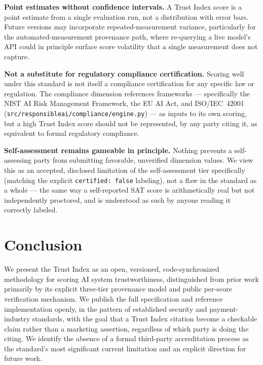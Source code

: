 \documentclass[11pt]{article}
\begin{document}
\textbf{Point estimates without confidence intervals.} A Trust Index
score is a point estimate from a single evaluation run, not a
distribution with error bars. Future versions may incorporate
repeated-measurement variance, particularly for the
automated-measurement provenance path, where re-querying a live
model's API could in principle surface score volatility that a single
measurement does not capture.

\textbf{Not a substitute for regulatory compliance certification.}
Scoring well under this standard is not itself a compliance
certification for any specific law or regulation. The compliance
dimension references frameworks --- specifically the NIST AI Risk
Management Framework, the EU AI Act, and ISO/IEC~42001
(\texttt{src/responsibleai/compliance/engine.py}) --- as inputs to its
own scoring, but a high Trust Index score should not be represented,
by any party citing it, as equivalent to formal regulatory compliance.

\textbf{Self-assessment remains gameable in principle.} Nothing
prevents a self-assessing party from submitting favorable, unverified
dimension values. We view this as an accepted, disclosed limitation of
the self-assessment tier specifically (matching the explicit
\texttt{certified: false} labeling), not a flaw in the standard as a
whole --- the same way a self-reported SAT score is arithmetically
real but not independently proctored, and is understood as such by
anyone reading it correctly labeled.

\section{Conclusion}

We present the Trust Index as an open, versioned, code-synchronized
methodology for scoring AI system trustworthiness, distinguished from
prior work primarily by its explicit three-tier provenance model and
public per-score verification mechanism. We publish the full
specification and reference implementation openly, in the pattern of
established security and payment-industry standards, with the goal
that a Trust Index citation become a checkable claim rather than a
marketing assertion, regardless of which party is doing the citing. We
identify the absence of a formal third-party accreditation process as
the standard's most significant current limitation and an explicit
direction for future work.
\end{document}
